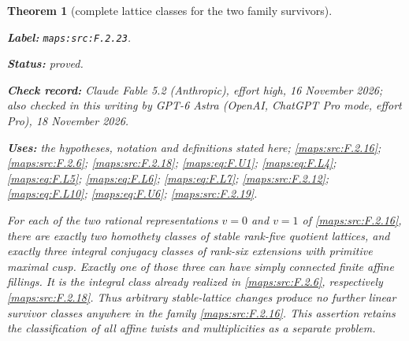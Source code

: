 \documentclass[11pt,a4paper]{article}
\newtheorem{theorem}{Theorem}[section]
\theoremstyle{definition}
\newcommand{\StatementRecord}[4]{\par\smallskip\begingroup\upshape\raggedright\noindent\textbf{Label:} \nolinkurl{#1}.\par\noindent\textbf{Status:} #2.\par\noindent\textbf{Check record:} #3.\par\noindent\textbf{Uses:} #4.\par\endgroup\smallskip}
\newcommand{\CurrentChecker}{GPT-6 Astra (OpenAI, ChatGPT Pro mode, effort Pro), 18 November 2026}
\begin{document}
\begin{theorem}[complete lattice classes for the two family survivors]\label{maps:src:F.2.23}
\StatementRecord{maps:src:F.2.23}{proved}{Claude Fable 5.2 (Anthropic), effort high, 16 November 2026; also checked in this writing by \CurrentChecker}{the hypotheses, notation and definitions stated here; \cref{maps:src:F.2.16}; \cref{maps:src:F.2.6}; \cref{maps:src:F.2.18}; \cref{maps:eq:F.U1}; \cref{maps:eq:F.L4}; \cref{maps:eq:F.L5}; \cref{maps:eq:F.L6}; \cref{maps:eq:F.L7}; \cref{maps:src:F.2.12}; \cref{maps:eq:F.L10}; \cref{maps:eq:F.U6}; \cref{maps:src:F.2.19}}


For each of the two rational representations $v=0$ and $v=1$
of \ref{maps:src:F.2.16}, there are exactly two homothety classes of stable
rank-five quotient lattices, and exactly three integral
conjugacy classes of rank-six extensions with primitive
maximal cusp.  Exactly one of those three can have simply
connected finite affine fillings.  It is the integral class
already realized in \ref{maps:src:F.2.6}, respectively \ref{maps:src:F.2.18}.
Thus arbitrary stable-lattice changes produce no further
linear survivor classes anywhere in the family \ref{maps:src:F.2.16}.
This assertion retains the classification of all affine
twists and multiplicities as a separate problem.

\end{theorem}
\end{document}
